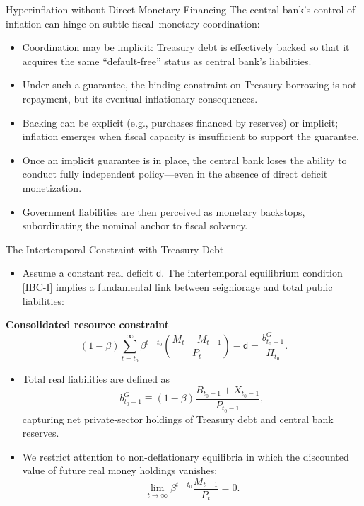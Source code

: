 \documentclass[11pt,aspectratio=169]{beamer}
\begin{document}
\begin{frame}{Hyperinflation without Direct Monetary Financing}
\small
The central bank’s control of inflation can hinge on subtle fiscal–monetary coordination:

\begin{itemize}
    \item Coordination may be implicit: Treasury debt is effectively backed so that it acquires the same \enquote{default-free} status as central bank's liabilities.
    \item Under such a guarantee, the binding constraint on Treasury borrowing is not repayment, but its eventual inflationary consequences.
    \item Backing can be explicit (e.g., purchases financed by reserves) or implicit; inflation emerges when fiscal capacity is insufficient to support the guarantee.
    \item Once an implicit guarantee is in place, the central bank loses the ability to conduct fully independent policy—even in the absence of direct deficit monetization.
    \item Government liabilities are then perceived as monetary backstops, subordinating the nominal anchor to fiscal solvency.
\end{itemize}
\end{frame}


\begin{frame}{The Intertemporal Constraint with Treasury Debt}
\small
\begin{itemize}
    \item Assume a constant real deficit \(\mathsf{d}\). The intertemporal equilibrium condition \eqref{IBC-I} implies a fundamental link between seigniorage and total public liabilities:
\end{itemize}

\vspace{0.2cm}
\textbf{Consolidated resource constraint}
\begin{equation}
(1-\beta )\sum_{t=t_{0}}^{\infty }\beta ^{t-t_{0}}
\left( \frac{M_{t}-M_{t-1}}{P_{t}}\right)
-\mathsf{d}
=\frac{b_{t_{0}-1}^{G}}{\Pi _{t_{0}}}.
\label{Key-Hyper}
\end{equation}

\begin{itemize}
    \item Total real liabilities are defined as
    \[
      b_{t_{0}-1}^{G}\equiv (1-\beta )\frac{B_{t_{0}-1}+X_{t_{0}-1}}{P_{t_{0}-1}},
    \]
    capturing net private-sector holdings of Treasury debt and central bank reserves.
    \item We restrict attention to non-deflationary equilibria in which the discounted value of future real money holdings vanishes:
    \[
      \lim_{t\to \infty} \beta^{t-t_{0}}\frac{M_{t-1}}{P_{t}}=0.
    \]
\end{itemize}
\end{frame}
\end{document}
